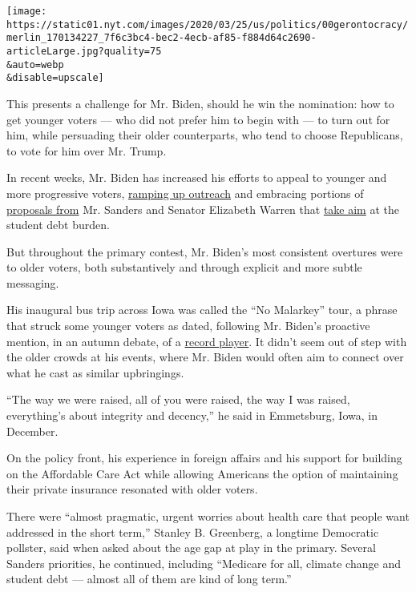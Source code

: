 \texttt{[image: https://static01.nyt.com/images/2020/03/25/us/politics/00gerontocracy/merlin\_170134227\_7f6c3bc4-bec2-4ecb-af85-f884d64c2690-articleLarge.jpg?quality=75\\\&auto=webp\\\&disable=upscale]}

This presents a challenge for Mr. Biden, should he win the nomination:
how to get younger voters --- who did not prefer him to begin with ---
to turn out for him, while persuading their older counterparts, who tend
to choose Republicans, to vote for him over Mr. Trump.

In recent weeks, Mr. Biden has increased his efforts to appeal to
younger and more progressive voters,
\href{https://www.nytimes.com/2020/03/17/us/politics/joe-biden-democrats-liberals.html}{ramping
up outreach} and embracing portions of
\href{https://www.nytimes.com/2020/03/15/us/politics/biden-backs-free-college.html}{proposals
from} Mr. Sanders and Senator Elizabeth Warren that
\href{https://www.nytimes.com/2020/03/14/us/politics/biden-warren-bankruptcy.html}{take
aim} at the student debt burden.

But throughout the primary contest, Mr. Biden's most consistent
overtures were to older voters, both substantively and through explicit
and more subtle messaging.

His inaugural bus trip across Iowa was called the ``No Malarkey'' tour,
a phrase that struck some younger voters as dated, following Mr. Biden's
proactive mention, in an autumn debate, of a
\href{https://www.nytimes.com/2019/09/12/us/politics/biden-record-player.html}{record
player}. It didn't seem out of step with the older crowds at his events,
where Mr. Biden would often aim to connect over what he cast as similar
upbringings.

``The way we were raised, all of you were raised, the way I was raised,
everything's about integrity and decency,'' he said in Emmetsburg, Iowa,
in December.

On the policy front, his experience in foreign affairs and his support
for building on the Affordable Care Act while allowing Americans the
option of maintaining their private insurance resonated with older
voters.

There were ``almost pragmatic, urgent worries about health care that
people want addressed in the short term,'' Stanley B. Greenberg, a
longtime Democratic pollster, said when asked about the age gap at play
in the primary. Several Sanders priorities, he continued, including
``Medicare for all, climate change and student debt --- almost all of
them are kind of long term.''

